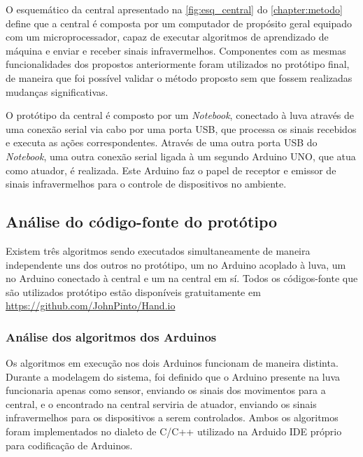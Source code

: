 O esquemático da central apresentado na \autoref{fig:esq_central} do \autoref{chapter:metodo} define que a central é composta por um computador de propósito geral equipado com um microprocessador, capaz de executar algoritmos de aprendizado de máquina e enviar e receber sinais infravermelhos. Componentes com as mesmas funcionalidades dos propostos anteriormente foram utilizados no protótipo final, de maneira que foi possível validar o método proposto sem que fossem realizadas mudanças significativas.

O protótipo da central é composto por um \textit{Notebook}, conectado à luva através de uma conexão serial via cabo por uma porta USB, que processa os sinais recebidos e executa as ações correspondentes. Através de uma outra porta USB do \textit{Notebook}, uma outra conexão serial ligada à um segundo Arduino UNO, que atua como atuador, é realizada. Este Arduino faz o papel de receptor e emissor de sinais infravermelhos para o controle de dispositivos no ambiente. 

\begin{center}
\end{center}

\subsection{Análise do código-fonte do protótipo}

Existem três algoritmos sendo executados simultaneamente de maneira independente uns dos outros no protótipo, um no Arduino acoplado à luva, um no Arduino conectado à central e um na central em sí. Todos os códigos-fonte que são utilizados protótipo estão disponíveis gratuitamente em \url{https://github.com/JohnPinto/Hand.io}

\subsubsection{Análise dos algoritmos dos Arduinos}

Os algoritmos em execução nos dois Arduinos funcionam de maneira distinta. Durante a modelagem do sistema, foi definido que o Arduino presente na luva funcionaria apenas como sensor, enviando os sinais dos movimentos para a central, e o encontrado na central serviria de atuador, enviando os sinais infravermelhos para os dispositivos a serem controlados. Ambos os algoritmos foram implementados no dialeto de C/C++ utilizado na Arduido IDE próprio para codificação de Arduinos.

